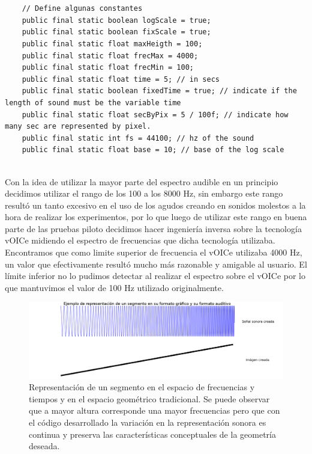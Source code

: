 \documentclass{article}
\begin{document}
    \begin{minipage}{\textwidth}
    \begin{lstlisting}[caption=Constantes y parámetros utilizados en el código que crea transforma la información geométrica en el estímulo sonoro., label=code:Constantes]
    
    
    // Define algunas constantes
	public final static boolean logScale = true;
	public final static boolean fixScale = true;
	public final static float maxHeigth = 100;
	public final static float frecMax = 4000;
	public final static float frecMin = 100;
	public final static float time = 5; // in secs
	public final static boolean fixedTime = true; // indicate if the length of sound must be the variable time
	public final static float secByPix = 5 / 100f; // indicate how many sec are represented by pixel.
	public final static int fs = 44100; // hz of the sound
	public final static float base = 10; // base of the log scale
    
    \end{lstlisting}
    \end{minipage}
    
    Con la idea de utilizar la mayor parte del espectro audible en un principio decidimos utilizar el rango de los 100 a los 8000 Hz, sin embargo este rango resultó un tanto excesivo en el uso de los agudos creando en sonidos molestos a la hora de realizar los experimentos, por lo que luego de utilizar este rango en buena parte de las pruebas piloto decidimos hacer ingeniería inversa sobre la tecnología vOICe midiendo el espectro de frecuencias que dicha tecnología utilizaba. Encontramos que como limite superior de frecuencia el vOICe utilizaba 4000 Hz, un valor que efectivamente resultó mucho más razonable y amigable al usuario. El límite inferior no lo pudimos detectar al realizar el espectro sobre el vOICe por lo que mantuvimos el valor de 100 Hz utilizado originalmente. 
    
    \begin{figure}
        \center
        \includegraphics[width=\textwidth]{Imagenes/rampaFrec.png}
        \caption{Representación de un segmento en el espacio de frecuencias y tiempos y en el espacio geométrico tradicional. Se puede observar que a mayor altura corresponde una mayor frecuencias pero que con el código desarrollado la variación en la representación sonora es continua y preserva las características conceptuales de la geometría deseada.}
        \label{fig:rampaFrec}
    \end{figure}
    
\end{document}
